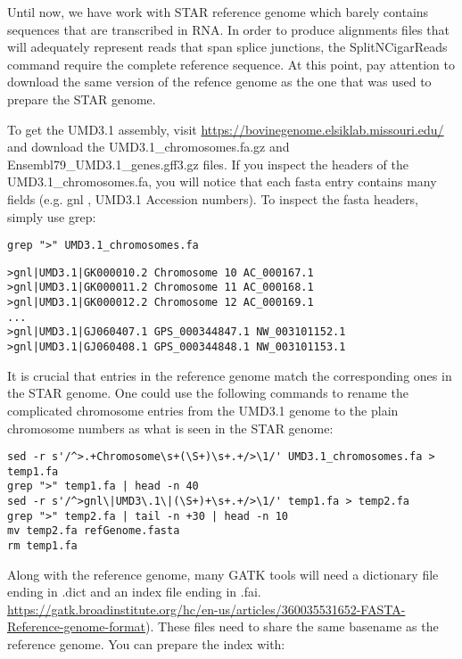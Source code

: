 Until now, we have work with STAR reference genome which barely contains sequences that are transcribed in RNA. In order to produce alignments files that will adequately represent reads that span splice junctions, the SplitNCigarReads command require the complete reference sequence. At this point, pay attention to download the same version of the refence genome as the one that was used to prepare the STAR genome.

To get the UMD3.1 assembly, visit \href{https://bovinegenome.elsiklab.missouri.edu/}{https://bovinegenome.elsiklab.missouri.edu/} and download the UMD3.1\_chromosomes.fa.gz and Ensembl79\_UMD3.1\_genes.gff3.gz files. If you inspect the headers of the UMD3.1\_chromosomes.fa, you will notice that each fasta entry contains many fields (e.g. gnl , UMD3.1 Accession numbers). To inspect the fasta headers, simply use grep:

\begin{verbatim}
grep ">" UMD3.1_chromosomes.fa
\end{verbatim}


\begin{verbatim}
>gnl|UMD3.1|GK000010.2 Chromosome 10 AC_000167.1
>gnl|UMD3.1|GK000011.2 Chromosome 11 AC_000168.1
>gnl|UMD3.1|GK000012.2 Chromosome 12 AC_000169.1
...
>gnl|UMD3.1|GJ060407.1 GPS_000344847.1 NW_003101152.1
>gnl|UMD3.1|GJ060408.1 GPS_000344848.1 NW_003101153.1
\end{verbatim}


It is crucial that entries in the reference genome match the corresponding ones in the STAR genome. One could use the following commands to rename the complicated chromosome entries from the UMD3.1 genome to the plain chromosome numbers as what is seen in the STAR genome:

\begin{verbatim}
sed -r s'/^>.+Chromosome\s+(\S+)\s+.+/>\1/' UMD3.1_chromosomes.fa > temp1.fa
grep ">" temp1.fa | head -n 40
sed -r s'/^>gnl\|UMD3\.1\|(\S+)+\s+.+/>\1/' temp1.fa > temp2.fa
grep ">" temp2.fa | tail -n +30 | head -n 10
mv temp2.fa refGenome.fasta
rm temp1.fa
\end{verbatim}


Along with the reference genome, many GATK tools will need a dictionary file ending in .dict and an index file ending in .fai.\href{ https://gatk.broadinstitute.org/hc/en-us/articles/360035531652-FASTA-Reference-genome-format} { https://gatk.broadinstitute.org/hc/en-us/articles/360035531652-FASTA-Reference-genome-format}). These files need to share the same basename as the reference genome. You can prepare the index with:

